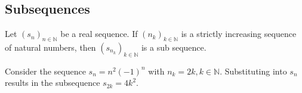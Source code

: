 \documentclass[../notes.tex]{subfiles}
\begin{document}
\subsection{Subsequences}

\begin{definition}[Subsequence]
    Let $(s_n)_{n\in \mathbb{N}}$ be a real sequence. If $(n_k)_{k \in \mathbb{N}}$ is a strictly increasing sequence of natural numbers, then $(s_{n_k})_{k\in \mathbb{N}}$ is a sub sequence.
\end{definition}

\begin{example}
    Consider the sequence $s_n = n^2 (-1)^n$ with $n_k = 2k, k \in \mathbb{N}$. Substituting into $s_n$ results in the subsequence $s_{2k} = 4k^2$.
\end{example}
\end{document}
